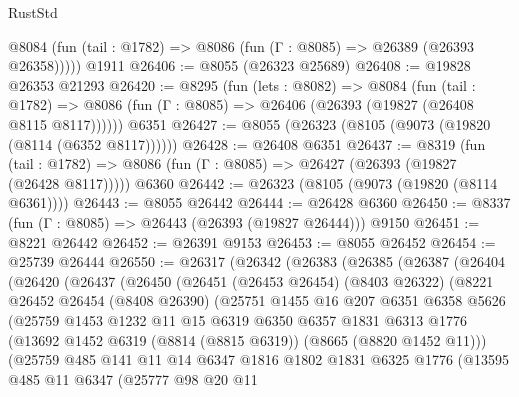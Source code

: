\begin{lexlean}{RustStd}
\begin{coremodule}
      @8084 (fun (tail : @1782) => @8086 (fun (Γ : @8085) => @26389 (@26393 @26358)))))
    @1911
@26406 := @8055 (@26323 @25689)
@26408 := @19828 @26353 @21293
@26420 := @8295
    (fun (lets : @8082) =>
    @8084
      (fun (tail : @1782) =>
      @8086 (fun (Γ : @8085) => @26406 (@26393 (@19827 (@26408 @8115 @8117))))))
    @6351
@26427 := @8055 (@26323 (@8105 (@9073 (@19820 (@8114 (@6352 @8117))))))
@26428 := @26408 @6351
@26437 := @8319
    (fun (tail : @1782) => @8086 (fun (Γ : @8085) => @26427 (@26393 (@19827 (@26428 @8117)))))
    @6360
@26442 := @26323 (@8105 (@9073 (@19820 (@8114 @6361))))
@26443 := @8055 @26442
@26444 := @26428 @6360
@26450 := @8337 (fun (Γ : @8085) => @26443 (@26393 (@19827 @26444))) @9150
@26451 := @8221 @26442
@26452 := @26391 @9153
@26453 := @8055 @26452
@26454 := @25739 @26444
@26550 := @26317
    (@26342
      (@26383
        (@26385
          (@26387
            (@26404
              (@26420
                (@26437
                  (@26450
                    (@26451
                      (@26453 @26454)
                      (@8403 @26322)
                      (@8221
                        @26452
                        @26454
                        (@8408 @26390)
                        (@25751
                          @1455
                          @16
                          @207
                          @6351
                          @6358
                          @5626
                          (@25759
                            @1453
                            @1232
                            @11
                            @15
                            @6319
                            @6350
                            @6357
                            @1831
                            @6313
                            @1776
                            (@13692 @1452 @6319 (@8814 (@8815 @6319)) (@8665 (@8820 @1452 @11)))
                            (@25759
                              @485
                              @141
                              @11
                              @14
                              @6347
                              @1816
                              @1802
                              @1831
                              @6325
                              @1776
                              (@13595
                                @485
                                @11
                                @6347
                                (@25777
                                  @98
                                  @20
                                  @11

\end{coremodule}
\end{lexlean}
